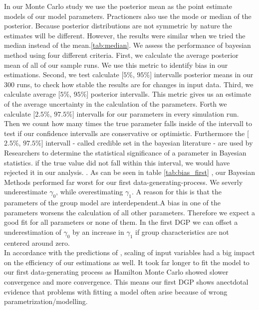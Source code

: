 In our Monte Carlo study we use the posterior mean as the point estimate models of our model parameters. Practioners also use the mode or median of the posterior. Because posterior distributions are not symmetric by nature the estimates will be different. 
However, the results were similar when we tried the median instead of the mean.\ref{tab:median}.
We assess the performance of bayesian method using four different criteria.
First, we calculate the average posterior mean of all of our sample runs. We use this metric to identify bias in our estimations. 
Second, we test calculate [$5\text{\%}$, $95\text{\%}$] intervalls posterior means in our 300 runs, to check how stable the results are for changes in input data.
Third, we calculate average [$5\text{\%}$, $95\text{\%}$] posterior intervalls. This metric gives us an estimate of the average uncertainty in the calculation of the parameters.
Forth we calculate [$2.5\text{\%}$, $97.5\text{\%}$] intervalls for our parameters in every simulation run. Then we count how many times the true parameter falls  inside of the intervall to test if our confidence intervalls are conservative or optimistic. Furthermore the [$2.5\text{\%}$, $97.5\text{\%}$] intervall - called credible set in the bayesian literature - are used by Researchers to determine the statistical significance of a parameter in Bayesian statistics. if the true value did not fall within this interval, we would have rejected it in our analysis. \cite{koop2003}.
As can be seen in table  \ref{tab:bias_first}  , our Bayesian Methods performed far worst for our first data-generating-process. We severly underestimate $\gamma_0$, while overestimating $\gamma_1$.
A reason for this is that the parameters of the group model are interdependent.A bias in one of the parameters worsens the calculation of all other parameters.  Therefore we expect a good fit for all parameters or none of them.  In the first DGP we can offset a underestimation of $\gamma_0$  by an increase in $\gamma_1$ if group characteristics are not centered around zero.\\
In accordance with the predictions of \cite{gelman2008weakly}, scaling of input variables had a big impact on the efficiency of our estimations as well. It took far longer to fit the model to our first data-generating process as Hamilton Monte Carlo showed slower convergence and more convergence. This means our first DGP shows anectdotal evidence that problems with fitting a model often arise because of wrong parametrization/modelling.\\

